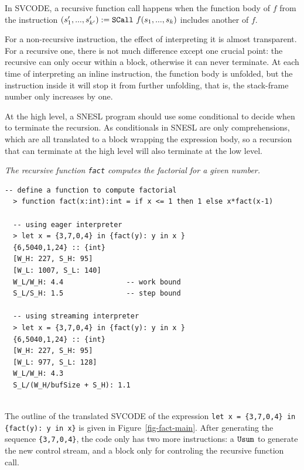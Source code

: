 In SVCODE, a recursive function call happens when the function body of $f$ from the instruction $\scall{f}{s_1,...,s_k}{(s_1',...,s'_{k'})}$ includes another \sc of  $f$.


For a non-recursive \sc instruction, the effect of interpreting it is almost transparent. 
For a recursive one, there is not much difference except one crucial point: the recursive \sc can only occur within a \wc block, otherwise it can never terminate.
At each time of interpreting an inline \sc instruction, the function body is unfolded, but the \wc instruction inside it will stop it from further unfolding, that is, the stack-frame number only increases by one. 

At the high level, a SNESL program should use some conditional to decide when to terminate the recursion. 
As conditionals in SNESL are only comprehensions, which are all translated to a \wc block wrapping the expression body,
so a recursion that can terminate at the high level will also terminate at the low level. 


\begin{example} \emph{The recursive function \texttt{fact} computes the factorial for a given number.}
\end{example}
\begin{lstlisting}[style=nesl-style]
  -- define a function to compute factorial
  > function fact(x:int):int = if x <= 1 then 1 else x*fact(x-1)
   
  -- using eager interpreter 
  > let x = {3,7,0,4} in {fact(y): y in x }
  {6,5040,1,24} :: {int}     
  [W_H: 227, S_H: 95]        
  [W_L: 1007, S_L: 140]      
  W_L/W_H: 4.4               -- work bound
  S_L/S_H: 1.5               -- step bound
  
  -- using streaming interpreter
  > let x = {3,7,0,4} in {fact(y): y in x }
  {6,5040,1,24} :: {int}     
  [W_H: 227, S_H: 95]       
  [W_L: 977, S_L: 128]      
  W_L/W_H: 4.3            
  S_L/(W_H/bufSize + S_H): 1.1
\end{lstlisting}

\hspace{1cm}\\
The outline of the translated SVCODE of the expression \texttt{let x = \{3,7,0,4\} in \{fact(y): y in x\}} is given in Figure~\ref{fig-fact-main}. After generating the sequence \texttt{\{3,7,0,4\}}, 
the code only has two more instructions: a $\usum$ to generate the new control stream, and a \wc block only for controling the recursive function call. 


